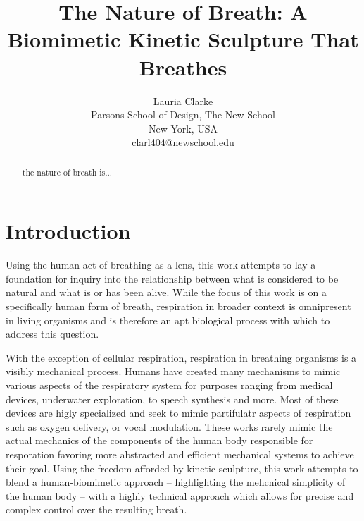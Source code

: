 \documentclass[letterpaper]{article}
\title{The Nature of Breath: A Biomimetic Kinetic Sculpture That Breathes}
\author{Lauria Clarke\\ Parsons School of Design, The New School\\ New York, USA\\ clarl404@newschool.edu\\
\newline
\newline
}
\begin{document}
 
\maketitle

\begin{abstract}
the nature of breath is...
\end{abstract}


\section{Introduction}



Using the human act of breathing as a lens, this work attempts to lay a foundation for inquiry into the relationship between what is considered to be natural and what is or has been alive. While the focus of this work is on a specifically human form of breath, respiration in broader context is omnipresent in living organisms and is therefore an apt biological process with which to address this question.  



With the exception of cellular respiration, respiration in breathing organisms is a visibly mechanical process. Humans have created many mechanisms to mimic various aspects of the respiratory system for purposes ranging from medical devices, underwater exploration, to speech synthesis and more. Most of these devices are higly specialized and seek to mimic partifulatr aspects of respiration such as oxygen delivery, or vocal modulation. These works rarely mimic the actual mechanics of the components of the human body responsible for resporation favoring more abstracted and efficient mechanical systems to achieve their goal. Using the freedom afforded by kinetic sculpture, this work attempts to blend a human-biomimetic approach -- highlighting the mehcnical simplicity of the human body -- with a highly technical approach which allows for precise and complex control over the resulting breath.    
\end{document}
